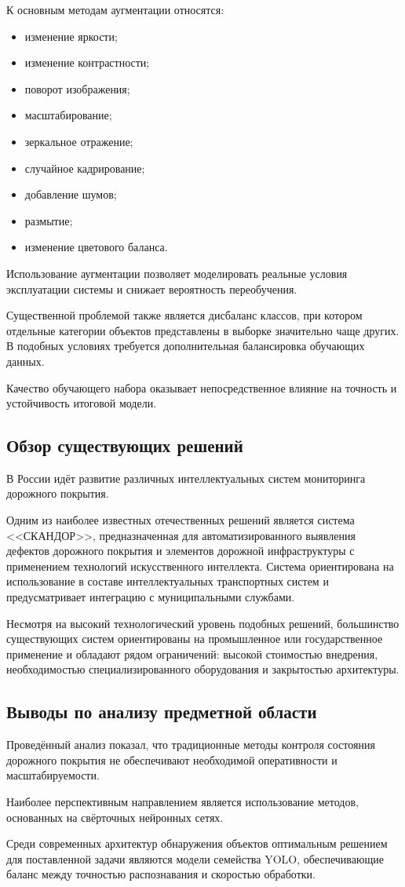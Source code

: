 К основным методам аугментации относятся:

\begin{itemize}
	\item изменение яркости;
	\item изменение контрастности;
	\item поворот изображения;
	\item масштабирование;
	\item зеркальное отражение;
	\item случайное кадрирование;
	\item добавление шумов;
	\item размытие;
	\item изменение цветового баланса.
\end{itemize}

Использование аугментации позволяет моделировать реальные условия эксплуатации системы и снижает вероятность переобучения.

Существенной проблемой также является дисбаланс классов, при котором отдельные категории объектов представлены в выборке значительно чаще других. В подобных условиях требуется дополнительная балансировка обучающих данных.

Качество обучающего набора оказывает непосредственное влияние на точность и устойчивость итоговой модели.

\subsection{Обзор существующих решений}

В России идёт развитие различных интеллектуальных систем мониторинга дорожного покрытия.

Одним из наиболее известных отечественных решений является система <<СКАНДОР>>, предназначенная для автоматизированного выявления дефектов дорожного покрытия и элементов дорожной инфраструктуры с применением технологий искусственного интеллекта. Система ориентирована на использование в составе интеллектуальных транспортных систем и предусматривает интеграцию с муниципальными службами.

Несмотря на высокий технологический уровень подобных решений, большинство существующих систем ориентированы на промышленное или государственное применение и обладают рядом ограничений: высокой стоимостью внедрения, необходимостью специализированного оборудования и закрытостью архитектуры.

\subsection{Выводы по анализу предметной области}

Проведённый анализ показал, что традиционные методы контроля состояния дорожного покрытия не обеспечивают необходимой оперативности и масштабируемости.

Наиболее перспективным направлением является использование методов, основанных на свёрточных нейронных сетях.

Среди современных архитектур обнаружения объектов оптимальным решением для поставленной задачи являются модели семейства YOLO, обеспечивающие баланс между точностью распознавания и скоростью обработки.
